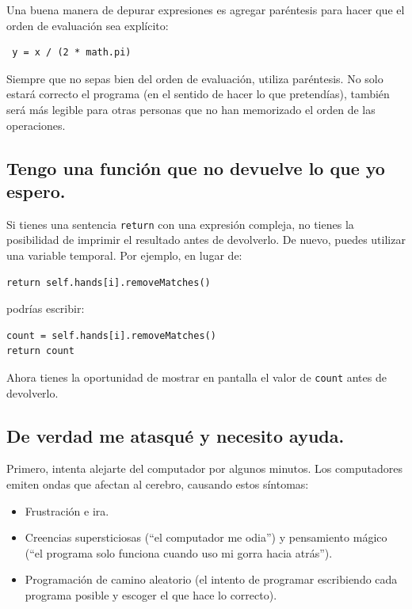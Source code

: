 \documentclass[10pt]{book}
\begin{document}
Una buena manera de depurar expresiones es agregar paréntesis para hacer
que el orden de evaluación sea explícito:

\begin{verbatim}
 y = x / (2 * math.pi)
\end{verbatim}
%
Siempre que no sepas bien del orden de evaluación, utiliza
paréntesis.  No solo estará correcto el programa (en el sentido
de hacer lo que pretendías), también será más legible para
otras personas que no han memorizado el orden de las operaciones.


\subsection{Tengo una función que no devuelve lo que
yo espero.}

Si tienes una sentencia {\tt return} con una expresión compleja,
no tienes la posibilidad de imprimir el resultado antes de
devolverlo.  De nuevo, puedes utilizar una variable temporal.  Por
ejemplo, en lugar de:

\begin{verbatim}
return self.hands[i].removeMatches()
\end{verbatim}
%
podrías escribir:

\begin{verbatim}
count = self.hands[i].removeMatches()
return count
\end{verbatim}
%
Ahora tienes la oportunidad de mostrar en pantalla el valor de
{\tt count} antes de devolverlo.


\subsection{De verdad me atasqué y necesito ayuda.}

Primero, intenta alejarte del computador por algunos minutos.
Los computadores emiten ondas que afectan al cerebro, causando estos
síntomas:

\begin{itemize}

\item Frustración e ira.

\item Creencias supersticiosas (``el computador me odia'') y
pensamiento mágico (``el programa solo funciona cuando uso mi
gorra hacia atrás'').

\item Programación de camino aleatorio (el intento de programar escribiendo
cada programa posible y escoger el que hace lo
correcto).

\end{itemize}
\end{document}
